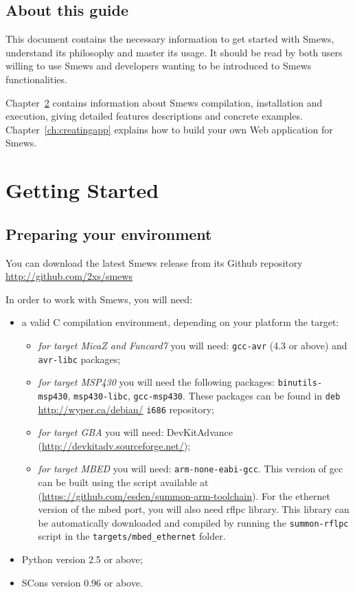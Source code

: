\documentclass{report}
\newcommand{\rchap}[1]{Chapter~\ref{ch:#1}}
\begin{document}
\section{About this guide}

This document contains the necessary information to get started with Smews, understand its philosophy and master its usage. It should be read by both users willing to use Smews and developers wanting to be introduced to Smews functionalities.

\rchap{gettingstarted} contains information about Smews compilation, installation and execution, giving detailed features descriptions and concrete examples. \rchap{creatingapp} explains how to build your own Web application for Smews.

\chapter{Getting Started}
\label{ch:gettingstarted}

\section{Preparing your environment}

You can download the latest Smews release from its Github repository \url{http://github.com/2xs/smews}

In order to work with Smews, you will need:
\begin{itemize}
  \item a valid C compilation environment, depending on your platform the target:
	\begin{itemize}
	  \item \emph{for target MicaZ and Funcard7} you will need: \verb+gcc-avr+  (4.3 or above) and \verb+avr-libc+ packages;
	  \item \emph{for target MSP430} you will need the following packages: \verb+binutils-msp430+, \verb+msp430-libc+, \verb+gcc-msp430+. These packages can be found in \verb+deb+ \url{http://wyper.ca/debian/} \verb+i686+ repository;
	  \item \emph{for target GBA} you will need: DevKitAdvance (\url{http://devkitadv.sourceforge.net/});
	  \item \emph{for target MBED} you will need: \verb+arm-none-eabi-gcc+. This version of gcc can be built using the script available at (\url{https://github.com/esden/summon-arm-toolchain}). For the ethernet version of the mbed port, you will also need rflpc library. This library can be automatically downloaded and compiled by running the \verb!summon-rflpc! script in the \verb!targets/mbed_ethernet! folder.
	\end{itemize}
  \item Python version 2.5 or above;
  \item SCons version 0.96 or above.
\end{itemize}
\end{document}
